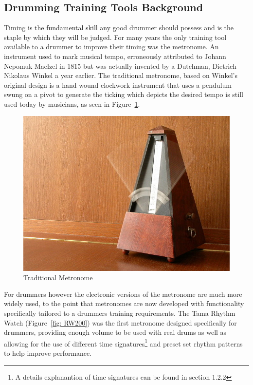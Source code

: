 \documentclass[a4paper, 11pt]{article}
\begin{document}
\subsection{Drumming Training Tools Background}
Timing is the fundamental skill any good drummer should possess and is the staple by which they will be judged. For many years the only training tool available to a drummer to improve their timing was the metronome. An instrument used to mark musical tempo, erroneously attributed to Johann Nepomuk Maelzel in 1815 but was actually invented by a Dutchman, Dietrich Nikolaus Winkel a year earlier. The traditional metronome, based on Winkel's original design is a hand-wound clockwork instrument that uses a pendulum swung on a pivot to generate the ticking which depicts the desired tempo \cite{brit-metro} is still used today by musicians, as seen in Figure~\ref{fig: TradMet}. \par

\begin{figure}[ht]
	\centering
	\includegraphics[scale=0.25]{TradMet}
	\caption{Traditional Metronome}%
	\label{fig: TradMet}
\end{figure}

For drummers however the electronic versions of the metronome are much more widely used, to the point that metronomes are now developed with functionality specifically tailored to a drummers training requirements. The Tama Rhythm Watch (Figure~\ref{fig: RW200}) was the first metronome designed specifically for drummers, providing enough volume to be used with real drums as well as allowing for the use of different time signatures\footnote{A details explanantion of time signatures can be found in section 1.2.2} and preset set rhythm patterns to help improve performance.\par
\end{document}
